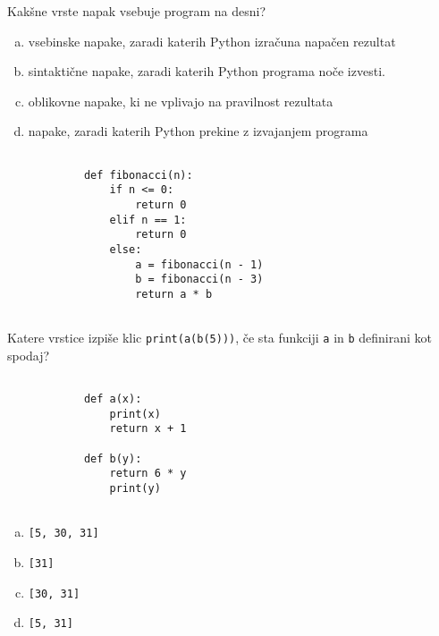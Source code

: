 \documentclass[arhiv, 10pt]{../izpit}
\newcommand{\inlinepy}[1]{\texttt{#1}}
\begin{document}
        \naloga*
        \begin{multicols}{2}
        \noindent
        Kakšne vrste napak vsebuje program na desni?

        \begin{enumerate}[(a)]
\item vsebinske napake, zaradi katerih Python izračuna napačen rezultat
\item sintaktične napake, zaradi katerih Python programa noče izvesti.
\item oblikovne napake, ki ne vplivajo na pravilnost rezultata
\item napake, zaradi katerih Python prekine z izvajanjem programa
\end{enumerate}

        \columnbreak

        \begin{verbatim}
        
            def fibonacci(n):
                if n <= 0:
                    return 0
                elif n == 1:
                    return 0
                else:
                    a = fibonacci(n - 1)
                    b = fibonacci(n - 3)
                    return a * b
            
        \end{verbatim}

        \end{multicols}

    
        \naloga*
        Katere vrstice izpiše klic \inlinepy{print(a(b(5)))}, če sta funkciji \inlinepy{a} in \inlinepy{b} definirani kot spodaj?

        \begin{multicols}{2}
        \begin{verbatim}
        
            def a(x):
                print(x)
                return x + 1

            def b(y):
                return 6 * y
                print(y)
        
        \end{verbatim}

        \begin{enumerate}[(a)]
\item \inlinepy{[5, 30, 31]}
\item \inlinepy{[31]}
\item \inlinepy{[30, 31]}
\item \inlinepy{[5, 31]}
\end{enumerate}

        \end{multicols}
    
\end{document}
